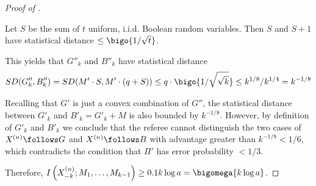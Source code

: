 \begin{proof}[Proof of ]
\begin{claim}
Let $S$ be the sum of $t$ uniform, i.i.d. Boolean random variables.
Then $S$ and $S+1$ have statistical distance $\le \bigo{1/\sqrt{t}}$. 
\end{claim}

This yields that $G''_k$ and $B''_k$ have statistical distance 
$$SD(G''_k, B''_k)=SD(M' \cdot S, M'\cdot(q+S))\le q\cdot \bigo{1/\sqrt{\sqrt{k}}}\le k^{1/8}/k^{1/4}=k^{-1/8}$$

Recalling that $G'$ is just a convex combination of $G''$, 
the statistical distance between $G'_k$ and $B'_k=G'_k+M$ is also bounded by $k^{-1/8}$. 
%
However, by definition of $G'_k$ and $B'_k$ we conclude that the referee cannot distinguish the two cases of $X^{(n)}\follows G$ and $X^{(n)}\follows B$ with advantage greater than $k^{-1/8}< 1/6$, which contradicts the condition that $\Pi'$ has error probability $<1/3$.
		
Therefore, 
$I\left(X^{(n)}_{-k}; M_1,\ldots, M_{k-1}\right)\ge 0.1 k\log a=\bigomega{k\log a}$.
\end{proof}	

\nocite{conf-version}
